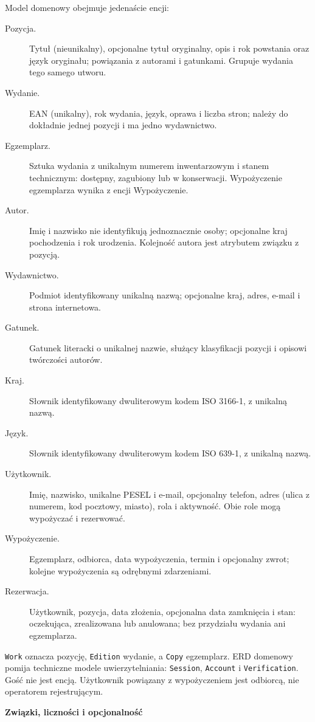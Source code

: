 \documentclass[11pt, a4paper]{article}
\begin{document}
Model domenowy obejmuje jedenaście encji:
\begin{description}
\item[Pozycja.] Tytuł (nieunikalny), opcjonalne tytuł oryginalny, opis i rok powstania oraz język oryginału; powiązania z autorami i gatunkami. Grupuje wydania tego samego utworu.
\item[Wydanie.] EAN (unikalny), rok wydania, język, oprawa i liczba stron; należy do dokładnie jednej pozycji i ma jedno wydawnictwo.
\item[Egzemplarz.] Sztuka wydania z unikalnym numerem inwentarzowym i stanem technicznym: dostępny, zagubiony lub w konserwacji. Wypożyczenie egzemplarza wynika z encji Wypożyczenie.
\item[Autor.] Imię i nazwisko nie identyfikują jednoznacznie osoby; opcjonalne kraj pochodzenia i rok urodzenia. Kolejność autora jest atrybutem związku z pozycją.
\item[Wydawnictwo.] Podmiot identyfikowany unikalną nazwą; opcjonalne kraj, adres, e-mail i strona internetowa.
\item[Gatunek.] Gatunek literacki o unikalnej nazwie, służący klasyfikacji pozycji i opisowi twórczości autorów.
\item[Kraj.] Słownik identyfikowany dwuliterowym kodem ISO 3166-1, z unikalną nazwą.
\item[Język.] Słownik identyfikowany dwuliterowym kodem ISO 639-1, z unikalną nazwą.
\item[Użytkownik.] Imię, nazwisko, unikalne PESEL i e-mail, opcjonalny telefon, adres (ulica z numerem, kod pocztowy, miasto), rola i aktywność. Obie role mogą wypożyczać i rezerwować.
\item[Wypożyczenie.] Egzemplarz, odbiorca, data wypożyczenia, termin i opcjonalny zwrot; kolejne wypożyczenia są odrębnymi zdarzeniami.
\item[Rezerwacja.] Użytkownik, pozycja, data złożenia, opcjonalna data zamknięcia i stan: oczekująca, zrealizowana lub anulowana; bez przydziału wydania ani egzemplarza.
\end{description}

\texttt{Work} oznacza pozycję, \texttt{Edition} wydanie, a \texttt{Copy} egzemplarz. ERD domenowy pomija techniczne modele uwierzytelniania: \texttt{Session}, \texttt{Account} i \texttt{Verification}. Gość nie jest encją. Użytkownik powiązany z wypożyczeniem jest odbiorcą, nie operatorem rejestrującym.

\noindent\textbf{Związki, liczności i opcjonalność}
\end{document}
